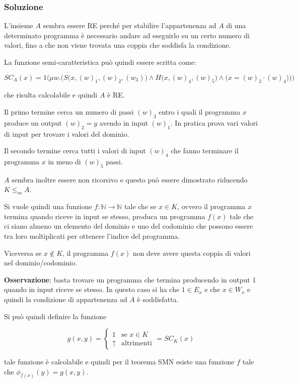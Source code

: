 \subsubsection{Soluzione}

L'insieme $A$ sembra essere RE perché per stabilire l'appartenenza ad $A$ di una determinato programma è necessario andare ad eseguirlo su un certo numero di valori, fino a che non viene trovata una coppia che soddisfa la condizione.

La funzione semi-caratteristica può quindi essere scritta come:

$$
SC_A(x) = 1 \bigg( \mu w . \Big( S\big(x, (w)_1, (w)_2, (w_3)\big) \wedge H\big(x, (w)_4, (w)_5\big) \wedge \big( x = (w)_2 \cdot (w)_4 \big)  \Big) \bigg)
$$

che risulta calcolabile e quindi $A$ è RE.

Il primo termine cerca un numero di passi $(w)_3$ entro i quali il programma $x$ produce un output $(w)_2 = y$ avendo in input $(w)_1$. In pratica prova vari valori di input per trovare i valori del dominio.

Il secondo termine cerca tutti i valori di input $(w)_4$ che fanno terminare il programma $x$ in meno di $(w)_5$ passi.

$A$ sembra inoltre essere non ricorsivo e questo può essere dimostrato riducendo $K \leq_m A$.

Si vuole quindi una funzione $f : \mathbb{N} \rightarrow \mathbb{N}$ tale che se $x \in K$, ovvero il programma $x$ termina quando riceve in input se stesso, produca un programma $f(x)$ tale che ci siano almeno un elemento del dominio e uno del codominio che possono essere tra loro moltiplicati per ottenere l'indice del programma. 

Viceversa se $x \notin K$, il programma $f(x)$ non deve avere questa coppia di valori nel dominio/codominio.

\textbf{Osservazione}: basta trovare un programma che termina producendo in output 1 quando in input riceve se stesso. In questo caso si ha che $1 \in E_x$ e che $x \in W_x$ e quindi la condizione di appartenenza ad $A$ è soddisfatta.

Si può quindi definire la funzione

$$
g(x,y) = \begin{cases}
1 &\text{se } x \in K\\
\uparrow &\text{altrimenti}
\end{cases} = SC_K(x)
$$

tale funzione è calcolabile e quindi per il teorema SMN esiste una funzione $f$ tale che $\phi_{f(x)}(y) = g(x,y)$.

